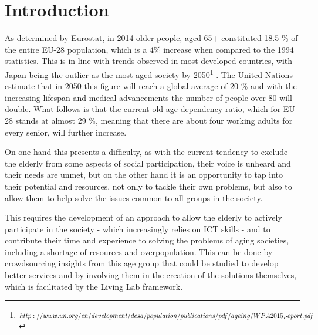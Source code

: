 \documentclass[sigconf]{acmart}
\begin{document}



\maketitle

% 


\section{Introduction}

As determined by Eurostat, in 2014 older people, aged 65+ constituted 18.5 \% of the entire EU-28 population, which is a 4\% increase when compared to the 1994 statistics. This is in line with trends observed in most developed countries, with Japan being the outlier as the most aged society by 2050\footnote{$http://www.un.org/en/development/desa/population/publications/pdf/ageing/WPA2015\\_Report.pdf$} . The United Nations estimate that in 2050 this figure will reach a global average of 20 \% and with the increasing lifespan and medical advancements the number of people over 80 will double.\cite{UNreport} What follows is that the current old-age dependency ratio, which for EU-28 stands at almost 29 \%, meaning that there are about four working adults for every senior, will further increase.

On one hand this presents a difficulty, as with the current tendency to exclude the elderly from some aspects of social participation, their voice is unheard and their needs are unmet, but on the other hand it is an opportunity to tap into their potential and resources, not only to tackle their own problems, but also to allow them to help solve the issues common to all groups in the society. 

This requires the development of an approach to allow the elderly to actively participate in the society - which increasingly relies on ICT skills - and to contribute their time and experience to solving the problems of aging societies, including a shortage of resources and overpopulation. This can be done by crowdsourcing insights from this age group that could be studied to develop better services and by involving them in the creation of the solutions themselves, which is facilitated by the Living Lab framework.
\end{document}
